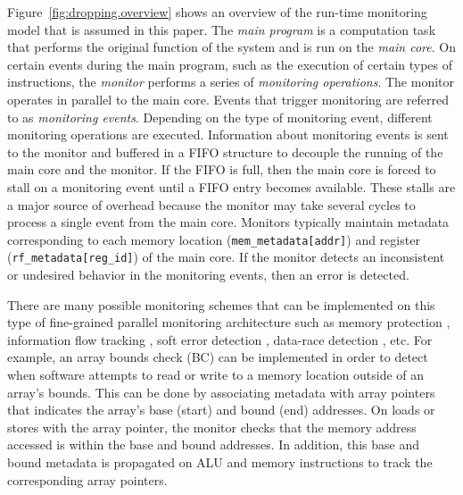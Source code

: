 Figure~\ref{fig:dropping.overview} shows an overview of the run-time monitoring
model that is assumed in this paper.  The \emph{main program} is a computation
task that performs the original function of the system and is run on the
\emph{main core}.  On certain events during the main program, such as the
execution of certain types of instructions, the \emph{monitor} performs a
series of \emph{monitoring operations}. The monitor operates in parallel to the
main core. Events that trigger monitoring are referred to as \emph{monitoring events}. Depending
on the type of monitoring event, different monitoring operations are
executed. Information about monitoring events is sent to the monitor and
buffered in a FIFO structure to decouple the
running of the main core and the monitor. If the FIFO is full, then the main
core is forced to stall on a monitoring event until a FIFO entry becomes
available. These stalls are a major source of
overhead because the monitor may take several cycles to process a single event
from the main core. 
Monitors typically maintain metadata corresponding to each memory location
({\tt mem\_metadata[addr]}) and register ({\tt rf\_metadata[reg\_id]}) of the
main core.
If the monitor
detects an inconsistent or undesired behavior in the monitoring events, then
an error is detected. 

There are many possible monitoring schemes that can be implemented on this type
of fine-grained parallel monitoring architecture such as memory protection
\cite{mondrian-asplos02}, information flow tracking \cite{dift-asplos04,
testudo-micro08}, soft error detection \cite{argus-micro07}, data-race
detection \cite{cord-hpca06, eraser-tocs97, literace-pldi09, pacer-pldi10}, etc.  For example, an array bounds check (BC)
\cite{hardbound-asplos08} can be implemented in order to detect
when software attempts to read or write to a memory location outside of an
array's bounds. This can be done by associating metadata with array pointers that 
indicates the array's base (start) and bound (end) addresses. On loads or stores with the
array
pointer, the monitor checks that the memory address accessed is within the base and
bound addresses. In addition, this base and bound metadata
is propagated on ALU and memory instructions to track the corresponding array pointers.

